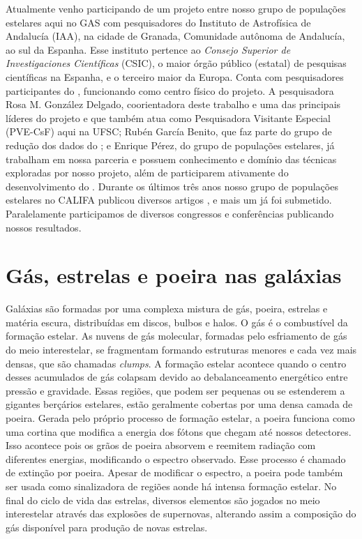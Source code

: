 Atualmente venho participando de um projeto entre nosso grupo de populações estelares aqui no GAS
com pesquisadores do Instituto de Astrofísica de Andalucía (IAA), na cidade de Granada, Comunidade
autônoma de Andalucía, ao sul da Espanha. Esse instituto pertence ao {\em Consejo Superior de
Investigaciones Científicas} (CSIC), o maior órgão público (estatal) de pesquisas científicas na
Espanha, e o terceiro maior da Europa. Conta com pesquisadores participantes do \PCAL, funcionando
como centro físico do projeto. A pesquisadora Rosa M. González Delgado, coorientadora deste
trabalho e uma das principais líderes do projeto e que também atua como Pesquisadora Visitante
Especial (PVE-CsF) aqui na UFSC; Rubén García Benito, que faz parte do grupo de redução dos dados do
\CALS; e Enrique Pérez, do grupo de populações estelares, já trabalham em nossa parceria e possuem
conhecimento e domínio das técnicas exploradas por nosso projeto, além de participarem ativamente do
desenvolvimento do \PCAL. Durante os últimos três anos nosso grupo de populações estelares no CALIFA
publicou diversos artigos \citep[e.g., ][]{Perez.etal.2013a, GonzalezDelgado.etal.2014a,
GonzalezDelgado.etal.2014b, GonzalezDelgado.etal.2015a}, e mais um já foi submetido. Paralelamente
participamos de diversos congressos e conferências publicando nossos resultados.


\section{Gás, estrelas e poeira nas galáxias}
\label{sec:intro:galaxias}

Galáxias são formadas por uma complexa mistura de gás, poeira, estrelas e matéria escura,
distribuídas em discos, bulbos e halos. O gás é o combustível da formação estelar. As nuvens de gás
molecular, formadas pelo esfriamento de gás do meio interestelar, se fragmentam formando estruturas
menores e cada vez mais densas, que são chamadas {\em clumps}. A formação estelar acontece quando o
centro desses acumulados de gás colapsam devido ao debalanceamento energético entre pressão e
gravidade. Essas regiões, que podem ser pequenas ou se estenderem a gigantes berçários estelares,
estão geralmente cobertas por uma densa camada de poeira. Gerada pelo próprio processo de formação
estelar, a poeira funciona como uma cortina que modifica a energia dos fótons que chegam até nossos
detectores. Isso acontece pois os grãos de poeira absorvem e reemitem radiação com diferentes
energias, modificando o espectro observado. Esse processo é chamado de extinção por poeira. Apesar
de modificar o espectro, a poeira pode também ser usada como sinalizadora de regiões aonde há
intensa formação estelar. No final do ciclo de vida das estrelas, diversos elementos são jogados no
meio interestelar através das explosões de supernovas, alterando assim a composição do gás
disponível para produção de novas estrelas.

